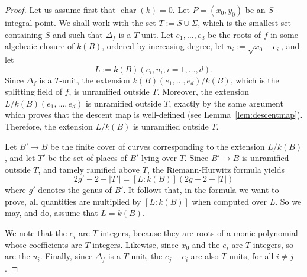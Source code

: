 \documentclass[11pt]{article}
\theoremstyle{plain}
\theoremstyle{definition}
\DeclareMathOperator{\car}{char}
\begin{document}
\begin{proof}
Let us assume first that $\car(k)=0$.
Let $P=(x_0,y_0)$ be an $S$-integral point. We shall work with the set $T:=S\cup \Sigma$, which is the smallest set containing $S$ and such that $\Delta_f$ is a $T$-unit. Let $e_1,\dots, e_d$ be the roots of $f$ in some algebraic closure of $k(B)$, ordered by increasing degree, let $u_i:=\sqrt{x_0-e_i}$, and let
$$
L:= k(B)(e_i,u_i,i=1,\dots,d).
$$
Since $\Delta_f$ is a $T$-unit, the extension $k(B)(e_1,\dots,e_d)/k(B)$, which is the splitting field of $f$, is unramified outside $T$. Moreover, the extension $L/k(B)(e_1,\dots,e_d)$ is unramified outside $T$, exactly by the same argument which proves that the descent map is well-defined (see Lemma~\ref{lem:descentmap}). Therefore, the extension $L/k(B)$ is unramified outside $T$.

Let $B'\to B$ be the finite cover of curves corresponding to the extension $L/k(B)$, and let $T'$ be the set of places of $B'$ lying over $T$. Since $B'\to B$ is unramified outside $T$, and tamely ramified above $T$, the Riemann-Hurwitz formula yields
\begin{equation}
\label{eq:RiemannHurwitz}
2g'-2+|T'| = [L:k(B)](2g-2+|T|)
\end{equation}
where $g'$ denotes the genus of $B'$.
It follows that, in the formula we want to prove, all quantities are multiplied by $[L:k(B)]$ when computed over $L$. So we may, and do, assume that $L=k(B)$.

We note that the $e_i$ are $T$-integers, because they are roots of a monic polynomial whose coefficients are $T$-integers. Likewise, since $x_0$ and the $e_i$ are $T$-integers, so are the $u_i$. Finally, since $\Delta_f$ is a $T$-unit, the $e_j-e_i$ are also $T$-units, for all $i\neq j$.


\end{proof}
\end{document}
